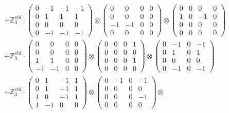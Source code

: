 \documentclass{article}
\begin{document}
{\begin{align}
        &+ \label{Rs16-Rc11-Solution-20-c22} \mathbb{Z}_3^{std} \cdot 
            \begin{pmatrix} 0 & -1 & -1 & -1 \\ 0 & 1 & 1 & 1 \\ 0 & 0 & 0 & 0 \\ 0 & -1 & -1 & -1 \end{pmatrix} \otimes 
            \begin{pmatrix} 0 & 0 & 0 & 0 \\ 0 & 0 & 0 & 0 \\ -1 & -1 & 0 & 0 \\ 0 & 0 & 0 & 0 \end{pmatrix} \otimes 
            \begin{pmatrix} 0 & 0 & 0 & 0 \\ 1 & 0 & -1 & 0 \\ 0 & 0 & 0 & 0 \\ 0 & 0 & 0 & 0 \end{pmatrix} \\ 
        &+ \label{Rs16-Rc11-Solution-20-c23} \mathbb{Z}_3^{std} \cdot 
            \begin{pmatrix} 0 & 0 & 0 & 0 \\ 0 & 0 & 0 & 0 \\ 1 & 1 & 0 & 0 \\ -1 & -1 & 0 & 0 \end{pmatrix} \otimes 
            \begin{pmatrix} 0 & 0 & 0 & 1 \\ 0 & 0 & 0 & 0 \\ 0 & 0 & 0 & 1 \\ 0 & 0 & 0 & 0 \end{pmatrix} \otimes 
            \begin{pmatrix} 0 & -1 & 0 & -1 \\ 0 & 1 & 0 & 1 \\ 0 & 0 & 0 & 0 \\ 0 & -1 & 0 & -1 \end{pmatrix} \\ 
        &+ \label{Rs16-Rc11-Solution-20-c24} \mathbb{Z}_3^{std} \cdot 
            \begin{pmatrix} 0 & 1 & -1 & 1 \\ 0 & 1 & -1 & 1 \\ 1 & 0 & -1 & 1 \\ 1 & -1 & 0 & 0 \end{pmatrix} \otimes 
            \begin{pmatrix} 0 & -1 & 0 & -1 \\ 0 & 0 & 0 & 0 \\ 0 & 0 & 0 & -1 \\ 0 & 0 & 0 & 0 \end{pmatrix} \otimes 

\end{align}}
\end{document}
